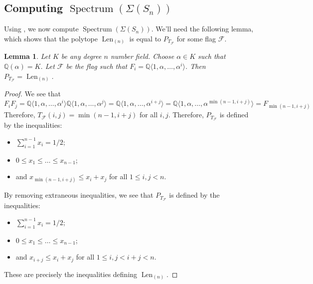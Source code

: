 \documentclass[letterpaper,10pt]{amsart}
\DeclareMathOperator{\Len}{Len}
\DeclareMathOperator{\Spe}{Spectrum}
\newcommand{\QQ}{\mathbb{Q}}      %
\newcommand{\la}{\langle}
\newcommand{\ra}{\rangle}
\newcommand{\cF}{\mathcal{F}}
\newtheorem{lemma}[theorem]{Lemma}
\theoremstyle{definition}
\theoremstyle{remark}
\begin{document}
\subsection{Computing $\Spe(\Sigma(S_n))$}
Using , we now compute $\Spe(\Sigma(S_n))$. We'll need the following lemma, which shows that the polytope $\Len_{(n)}$ is equal to $P_{T_{\cF}}$ for some flag $\cF$. 

\begin{lemma}
\label{lem:len-n}
Let $K$ be any degree $n$ number field. Choose $\alpha \in K$ such that $\QQ(\alpha) = K$. Let $\cF$ be the flag such that $F_i = \QQ \la 1,\alpha,\dots,\alpha^i \ra$. Then $P_{T_{\cF}} = \Len_{(n)}$.
\end{lemma}
\begin{proof}
We see that
\[
    F_iF_j = \QQ \la 1,\alpha,\dots,\alpha^i \ra\QQ \la 1,\alpha,\dots,\alpha^j \ra = \QQ \la 1,\alpha,\dots,\alpha^{i+j} \ra = \QQ \la 1,\alpha,\dots,\alpha^{\min(n-1,i+j)} \ra = F_{\min( n-1,i+j)}
\]
Therefore, $T_{\cF}(i,j) = \min(n-1, i+j)$ for all $i,j$. Therefore, $P_{T_{\cF}}$ is defined by the inequalities:
\begin{itemize}
    \item $\sum_{i = 1}^{n-1}x_i = 1/2$;
    \item $0 \leq x_1 \leq \dots \leq x_{n-1}$;
    \item and $x_{\min(n-1,i+j)} \leq x_i + x_j$ for all $1 \leq i,j < n$.
\end{itemize}
By removing extraneous inequalities, we see that $P_{T_{\cF}}$ is defined by the inequalities:
\begin{itemize}
    \item $\sum_{i = 1}^{n-1}x_i = 1/2$;
    \item $0 \leq x_1 \leq \dots \leq x_{n-1}$;
    \item and $x_{i+j} \leq x_i + x_j$ for all $1 \leq i,j < i +j < n$.
\end{itemize}
These are precisely the inequalities defining $\Len_{(n)}$.
\end{proof}
\end{document}
